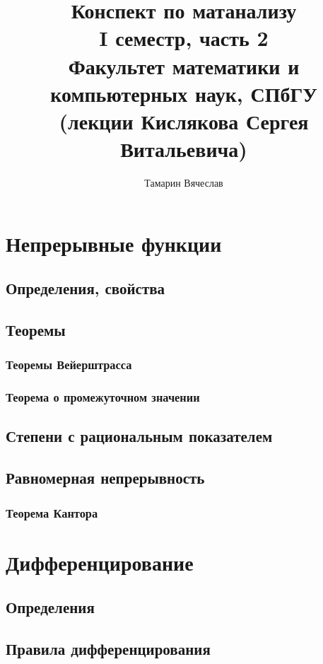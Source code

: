 \documentclass[11pt]{book}
\title{Конспект по матанализу\\I семестр, часть 2\\
    Факультет математики и компьютерных наук, СПбГУ\\
(лекции Кислякова Сергея Витальевича)}
\author{Тамарин Вячеслав}
\theoremstyle{definition}
\theoremstyle{plain}
\theoremstyle{plain}
\theoremstyle{definition}
\theoremstyle{remark}
\begin{document}
\maketitle
\tableofcontents


\chapter{Непрерывные функции}
\section{Определения, свойства}
\section{Теоремы}
\subsection{Теоремы Вейерштрасса}
\subsection{Теорема о промежуточном значении}
\section{Степени с рациональным показателем}
\section{Равномерная непрерывность}
\subsection{Теорема Кантора}
\chapter{Дифференцирование}
\section{Определения}
\section{Правила дифференцирования}
\end{document}
